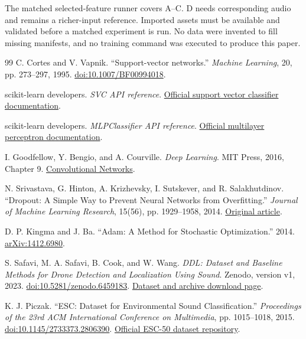 \documentclass[11pt,letterpaper]{article}
\begin{document}
The matched selected-feature runner covers A--C. D needs corresponding audio
and remains a richer-input reference. Imported assets must be available and
validated before a matched experiment is run. No data were invented to fill
missing manifests, and no training command was executed to produce this paper.

\begin{thebibliography}{99}
C. Cortes and V. Vapnik. ``Support-vector networks.''
\emph{Machine Learning}, 20, pp. 273--297, 1995.
\href{https://doi.org/10.1007/BF00994018}{doi:10.1007/BF00994018}.

scikit-learn developers. \emph{SVC API reference}.
\href{https://scikit-learn.org/stable/modules/generated/sklearn.svm.SVC.html}{Official support vector classifier documentation}.

scikit-learn developers. \emph{MLPClassifier API reference}.
\href{https://scikit-learn.org/stable/modules/generated/sklearn.neural_network.MLPClassifier.html}{Official multilayer perceptron documentation}.

I. Goodfellow, Y. Bengio, and A. Courville. \emph{Deep Learning}.
MIT Press, 2016, Chapter 9.
\href{https://www.deeplearningbook.org/contents/convnets.html}{Convolutional Networks}.

N. Srivastava, G. Hinton, A. Krizhevsky, I. Sutskever, and R. Salakhutdinov.
``Dropout: A Simple Way to Prevent Neural Networks from Overfitting.''
\emph{Journal of Machine Learning Research}, 15(56), pp. 1929--1958, 2014.
\href{https://www.jmlr.org/papers/v15/srivastava14a.html}{Original article}.

D. P. Kingma and J. Ba. ``Adam: A Method for Stochastic Optimization.''
2014. \href{https://arxiv.org/abs/1412.6980}{arXiv:1412.6980}.

S. Safavi, M. A. Safavi, B. Cook, and W. Wang.
\emph{DDL: Dataset and Baseline Methods for Drone Detection and Localization
Using Sound}. Zenodo, version v1, 2023.
\href{https://doi.org/10.5281/zenodo.6459183}{doi:10.5281/zenodo.6459183}.
\href{https://zenodo.org/records/6459183}{Dataset and archive download page}.

K. J. Piczak. ``ESC: Dataset for Environmental Sound Classification.''
\emph{Proceedings of the 23rd ACM International Conference on Multimedia},
pp. 1015--1018, 2015.
\href{https://doi.org/10.1145/2733373.2806390}{doi:10.1145/2733373.2806390}.
\href{https://github.com/karolpiczak/ESC-50}{Official ESC-50 dataset repository}.


\end{thebibliography}
\end{document}
